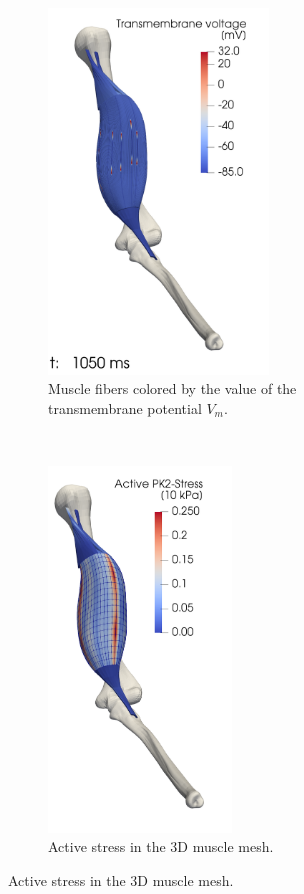 \begin{figure}
  \centering%
  \begin{subfigure}[t]{0.34\textwidth}%
    \centering%
    \includegraphics[height=97mm]{images/results/application/precice_activated_muscles1.png}%
    \caption{Muscle fibers colored by the value of the transmembrane potential $V_m$.}%
    \label{fig:precice_activated_muscles_1}%
  \end{subfigure}\,
  \begin{subfigure}[t]{0.28\textwidth}%
    \centering%
    \includegraphics[height=97mm]{images/results/application/precice_activated_muscles2.png}%
    \caption{Active stress in the 3D muscle mesh.}%
    \label{fig:precice_activated_muscles_2}%
  \end{subfigure}

\end{figure}
